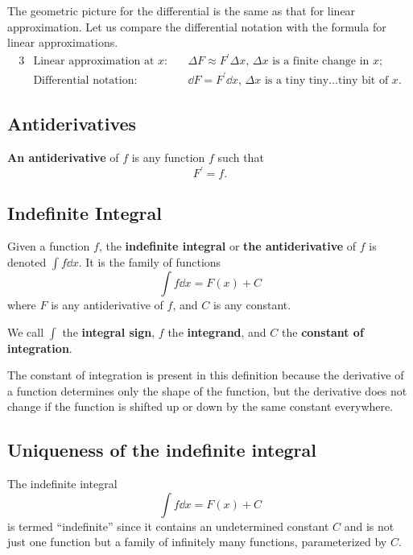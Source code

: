 The geometric picture for the differential is the same as that for linear approximation.
Let us compare the differential notation with the formula for linear approximations.
\begin{alignat*}{3}
& \text{Linear approximation at $x$:} & \: & \Delta F\approx F^\prime\Delta x\text{, $\Delta x$ is a finite change in $x$;}\\
& \text{Differential notation:}       &    & \dd F=F^\prime\dd x\text{, $\Delta x$ is a tiny tiny\ldots tiny bit of $x$.}
\end{alignat*}

\subsection{Antiderivatives}
\textbf{An antiderivative} of $f$ is any function $f$ such that
\[F^\prime=f.\]

\subsection{Indefinite Integral}
Given a function $f$, the \textbf{indefinite integral} or \textbf{the antiderivative} of $f$ is denoted $\int f\dd x$. It is the family of functions
\[\int f\dd x=F(x)+C\]
where $F$ is any antiderivative of $f$, and $C$ is any constant.

We call $\int$ the \textbf{integral sign}, $f$ the \textbf{integrand}, and $C$ the \textbf{constant of integration}.

\begin{note}
The constant of integration is present in this definition because the derivative of a function determines only the shape of the function, but the derivative does not change if the function is shifted up or down by the same constant everywhere.
\end{note}

\subsection{Uniqueness of the indefinite integral}
The indefinite integral
\[\int f\dd x=F(x)+C\]
is termed ``indefinite'' since it contains an undetermined constant $C$ and is not just one function but a family of infinitely many functions, parameterized by $C$.

